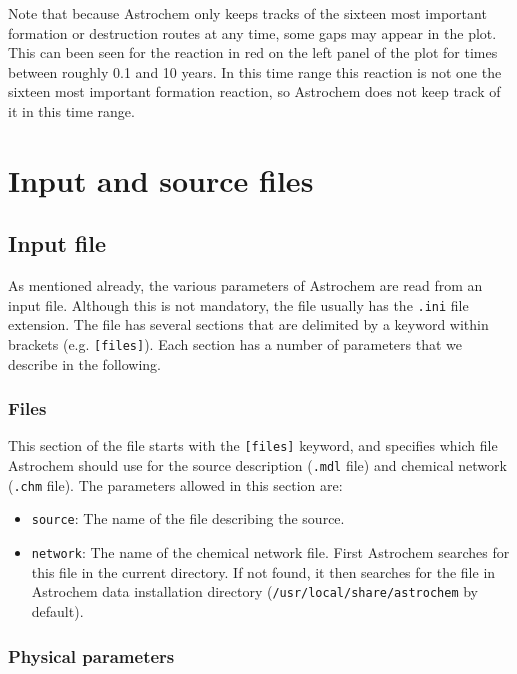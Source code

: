 \documentclass[a4paper,12pt]{article}
\begin{document}
Note that because Astrochem only keeps tracks of the sixteen most
important formation or destruction routes at any time, some gaps may
appear in the plot. This can been seen for the reaction in red on the
left panel of the plot for times between roughly 0.1 and 10 years. In
this time range this reaction is not one the sixteen most important
formation reaction, so Astrochem does not keep track of it in this
time range.

\section{Input and source files}
\label{sec:input-source-files}

\subsection{Input file}
\label{sec:input-file}

As mentioned already, the various parameters of Astrochem are read
from an input file. Although this is not mandatory, the file usually
has the \verb=.ini= file extension. The file has several sections that
are delimited by a keyword within brackets (e.g. \verb=[files]=). Each
section has a number of parameters that we describe in the following.

\subsubsection{Files}
\label{sec:files}

This section of the file starts with the \verb=[files]= keyword, and
specifies which file Astrochem should use for the source description
(\verb=.mdl= file) and chemical network (\verb=.chm= file). The
parameters allowed in this section are:

\begin{itemize}

\item \verb=source=: The name of the file describing the source.

\item \verb=network=: The name of the chemical network file. First
  Astrochem searches for this file in the current directory. If not
  found, it then searches for the file in Astrochem data installation
  directory (\verb=/usr/local/share/astrochem= by default).

\end{itemize}

\subsubsection{Physical parameters}
\label{sec:physical-parameters}
\end{document}
